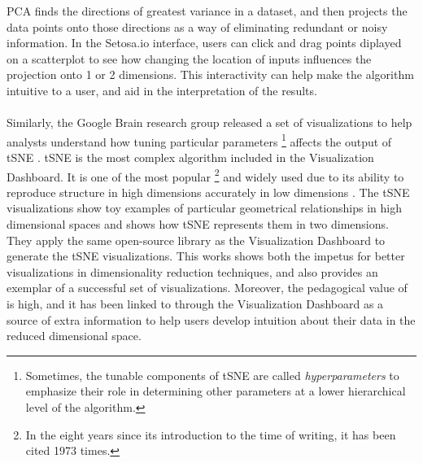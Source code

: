 \documentclass{sigchi}
\begin{document}
%
PCA finds the directions of greatest variance in a dataset, and then projects the data points onto those directions as a way of eliminating redundant or noisy information. %
%
In the Setosa.io interface, users can click and drag points diplayed on a scatterplot to see how changing the location of inputs influences the projection onto 1 or 2 dimensions. %
%
This interactivity can help make the algorithm intuitive to a user, and aid in the interpretation of the results. %
%
\\\\
%
Similarly, the Google Brain research group released a set of visualizations \cite{wattenberg2016how} to help analysts understand how tuning particular parameters%
%
\footnote{Sometimes, the tunable components of tSNE are called \textit{hyperparameters} to emphasize their role in determining other parameters at a lower hierarchical level of the algorithm.} affects the output of tSNE \cite{maaten2008visualizing}. %
%
tSNE is the most complex algorithm included in the Visualization Dashboard. %
%
It is one of the most popular%
%
\footnote{In the eight years since its introduction to the time of writing, it has been cited 1973 times.} %
%
and widely used due to its ability to reproduce structure in high dimensions accurately in low dimensions \cite{maaten2008visualizing}. %
%
The tSNE visualizations show toy examples of particular geometrical relationships in high dimensional spaces and shows how tSNE represents them in two dimensions. %
%
They apply the same open-source library as the Visualization Dashboard to generate the tSNE visualizations. %
%
This works shows both the impetus for better visualizations in dimensionality reduction techniques, and also provides an exemplar of a successful set of visualizations. %
%
Moreover, the pedagogical value of \cite{wattenberg2016how} is high, and it has been linked to through the Visualization Dashboard as a source of extra information to help users develop intuition about their data in the reduced dimensional space.
%
%
%
\end{document}
